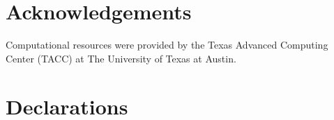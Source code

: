 \documentclass[12pt,a4paper]{article}%
\theoremstyle{plain}%
\theoremstyle{remark}%
\theoremstyle{definition}%
\providecommand{\DIFdelbegin}{} %
\newcommand{\DIFscaledelfig}{0.5}
\newlength{\DIFdelgraphicswidth} %
\newlength{\DIFdelgraphicsheight} %
\newcommand{\DIFdelincludegraphics}[2][]{%
\sbox{\DIFdelgraphicsbox}{\DIFOincludegraphics[#1]{#2}}%
\settoboxwidth{\DIFdelgraphicswidth}{\DIFdelgraphicsbox} %
\settoboxtotalheight{\DIFdelgraphicsheight}{\DIFdelgraphicsbox} %
\scalebox{\DIFscaledelfig}{%
\parbox[b]{\DIFdelgraphicswidth}{\usebox{\DIFdelgraphicsbox}\\[-\baselineskip] \rule{\DIFdelgraphicswidth}{0em}}\llap{\resizebox{\DIFdelgraphicswidth}{\DIFdelgraphicsheight}{%
\setlength{\unitlength}{\DIFdelgraphicswidth}%
\begin{picture}(1,1)%
\thicklines\linethickness{2pt} %
{\color[rgb]{1,0,0}\put(0,0){\framebox(1,1){}}}%
{\color[rgb]{1,0,0}\put(0,0){\line( 1,1){1}}}%
{\color[rgb]{1,0,0}\put(0,1){\line(1,-1){1}}}%
\end{picture}%
}\hspace*{3pt}}} %
} %
\DeclareRobustCommand{\DIFdelbegin}{\DIFOdelbegin \let\includegraphics\DIFdelincludegraphics} %
\begin{document}
\section*{Acknowledgements}

Computational resources were provided by the Texas Advanced Computing Center (TACC) at The University of Texas at Austin.

\section*{Declarations}

\DIFdelbegin %




\end{document}
